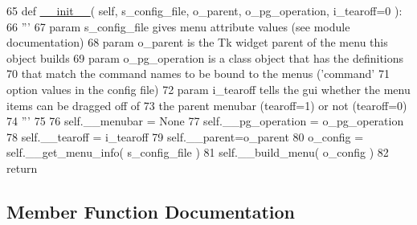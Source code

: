 \begin{DoxyCode}
65     \textcolor{keyword}{def }\hyperlink{classgui__frontend__popgen__program_1_1pgmenubuilder_1_1PGMenuBuilder_a09e525c5459e1d60f7aaa31cc7b6e0ea}{\_\_init\_\_}( self, s\_config\_file, o\_parent, o\_pg\_operation, i\_tearoff=0 ):
66         \textcolor{stringliteral}{'''}
67 \textcolor{stringliteral}{        param s\_config\_file gives menu attribute values (see module documentation)}
68 \textcolor{stringliteral}{        param o\_parent is the Tk widget parent of the menu this object builds}
69 \textcolor{stringliteral}{        param o\_pg\_operation is a class object that has the definitions}
70 \textcolor{stringliteral}{                that match the command names to be bound to the menus ('command' }
71 \textcolor{stringliteral}{                option values in the config file)}
72 \textcolor{stringliteral}{        param i\_tearoff tells the gui whether the menu items can be dragged off of }
73 \textcolor{stringliteral}{            the parent menubar (tearoff=1) or not (tearoff=0)}
74 \textcolor{stringliteral}{        '''}
75 
76         self.\_\_menubar = \textcolor{keywordtype}{None}
77         self.\_\_pg\_operation = o\_pg\_operation
78         self.\_\_tearoff = i\_tearoff
79         self.\_\_parent=o\_parent
80         o\_config = self.\_\_get\_menu\_info( s\_config\_file )
81         self.\_\_build\_menu( o\_config )
82         \textcolor{keywordflow}{return}
\end{DoxyCode}


\subsection{Member Function Documentation}
